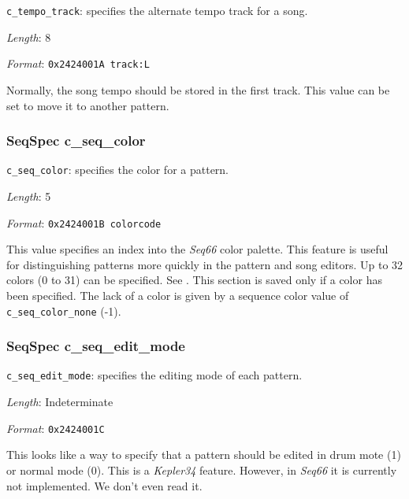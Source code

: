   \begin{description}
      \item \texttt{c\_tempo\_track}:
         specifies the alternate tempo track for a song.
      \item \textsl{Length}: 8
      \item \textsl{Format}: \texttt{0x2424001A track:L}
   \end{description}

   Normally, the song tempo should be stored in the first track.
   This value can be set to move it to another pattern.

\subsubsection{SeqSpec c\_seq\_color}
\label{subsubsec:midi_format_track_seqspec_seq_color}

   \begin{description}
      \item \texttt{c\_seq\_color}: specifies the color for a pattern.
      \item \textsl{Length}: 5
      \item \textsl{Format}: \texttt{0x2424001B colorcode}
   \end{description}

   This value specifies an index into the \textsl{Seq66} color palette.
   This feature is useful for distinguishing patterns more quickly in the
   pattern and song editors. Up to 32 colors (0 to 31) can be specified.
   See .
   This section is saved only if a color has been specified.
   The lack of a color is given by a sequence color value of
   \texttt{c\_seq\_color\_none} (-1).

\subsubsection{SeqSpec c\_seq\_edit\_mode}
\label{subsubsec:midi_format_track_seqspec_seq_edit_mode}

   \begin{description}
      \item \texttt{c\_seq\_edit\_mode}:
         specifies the editing mode of each pattern.
      \item \textsl{Length}: Indeterminate
      \item \textsl{Format}: \texttt{0x2424001C}
   \end{description}

   This looks like a way to specify that a pattern should be edited in drum
   mote (1) or normal mode (0).  This is a \textsl{Kepler34} feature. However,
   in \textsl{Seq66} it is currently not implemented.  We don't even read it.

